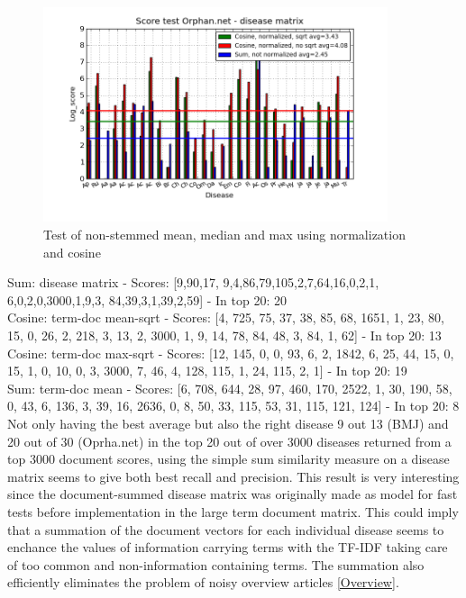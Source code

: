 \begin{figure}[h!]
        \begin{center}
          \includegraphics[width=0.9\textwidth]{barcharts/diseaseMatrix_orphan_hist_NOTnorm_3000_s_cos_sqrt_cos_sum_nn.png}
        \end{center}
        \caption{Test of non-stemmed mean, median and max using normalization and cosine}
        \label{termDoc_orphan_hist_3000_sum_dm_mea_cos_sqrt_td_max_cos_sqrt_td_mea_sum_nn_td}
\end{figure}

Sum: disease matrix - Scores: [9,90,17, 9,4,86,79,105,2,7,64,16,0,2,1, 6,0,2,0,3000,1,9,3, 84,39,3,1,39,2,59] - In top 20: 20 \\
Cosine: term-doc mean-sqrt - Scores: [4, 725, 75, 37, 38, 85, 68, 1651, 1, 23, 80, 15, 0, 26, 2, 218, 3, 13, 2, 3000, 1, 9, 14, 78, 84, 48, 3, 84, 1, 62] - In top 20: 13 \\
Cosine: term-doc max-sqrt - Scores: [12, 145, 0, 0, 93, 6, 2, 1842, 6, 25, 44, 15, 0, 15, 1, 0, 10, 0, 3, 3000, 7, 46, 4, 128, 115, 1, 24, 115, 2, 1] - In top 20: 19 \\
Sum: term-doc mean - Scores: [6, 708, 644, 28, 97, 460, 170, 2522, 1, 30, 190, 58, 0, 43, 6, 136, 3, 39, 16, 2636, 0, 8, 50, 33, 115, 53, 31, 115, 121, 124] - In top 20: 8 \\

Not only having the best average but also the right disease 9 out 13 (BMJ) and 20 out of 30 (Oprha.net) in the top 20 out of over 3000 diseases returned from a top 3000 document scores, using the simple sum similarity measure on a disease matrix seems to give both best recall and precision. This result is very interesting since the document-summed disease matrix was originally made as model for fast tests before implementation in the large term document matrix. This could imply that a summation of the document vectors for each individual disease seems to enchance the values of information carrying terms with the TF-IDF taking care of too common and non-information containing terms. The summation also efficiently eliminates the problem of noisy overview articles \ref{Overview}. \\

